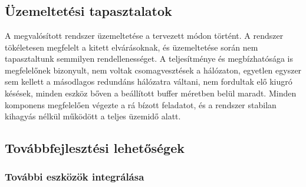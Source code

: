 \chapter{\FurtherDevelopment}

\section{Üzemeltetési tapasztalatok}

A megvalósított rendszer üzemeltetése a tervezett módon történt. A rendszer
tökéletesen megfelelt a kitett elvárásoknak, és üzemeltetése során nem
tapasztaltunk semmilyen rendellenességet. A teljesítménye és megbízhatósága is megfelelőnek bizonyult, nem 
voltak csomagvesztések a hálózaton, egyetlen egyszer sem kellett a másodlagos redundáns hálózatra
váltani, nem fordultak elő kiugró késések, minden eszköz bőven a beállított buffer méretben belül maradt.
Minden komponens megfelelően végezte a rá bízott feladatot, és a rendszer
stabilan kihagyás nélkül működött a teljes üzemidő alatt. 

\section{Továbbfejlesztési lehetőségek}


\subsection{További eszközök integrálása}

